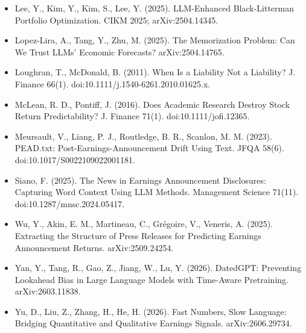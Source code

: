 \documentclass[xelatex,ja=standard,jafont=haranoaji,a4paper,10pt]{bxjsarticle}
\begin{document}
\begin{small}
\begin{itemize}[leftmargin=1.2em,itemsep=0.1em]
\item Lee, Y., Kim, Y., Kim, S., Lee, Y. (2025). LLM-Enhanced Black-Litterman Portfolio Optimization. CIKM 2025; arXiv:2504.14345.
\item Lopez-Lira, A., Tang, Y., Zhu, M. (2025). The Memorization Problem: Can We Trust LLMs' Economic Forecasts? arXiv:2504.14765.
\item Loughran, T., McDonald, B. (2011). When Is a Liability Not a Liability? J. Finance 66(1). doi:10.1111/j.1540-6261.2010.01625.x.
\item McLean, R. D., Pontiff, J. (2016). Does Academic Research Destroy Stock Return Predictability? J. Finance 71(1). doi:10.1111/jofi.12365.
\item Meursault, V., Liang, P. J., Routledge, B. R., Scanlon, M. M. (2023). PEAD.txt: Post-Earnings-Announcement Drift Using Text. JFQA 58(6). doi:10.1017/S0022109022001181.
\item Siano, F. (2025). The News in Earnings Announcement Disclosures: Capturing Word Context Using LLM Methods. Management Science 71(11). doi:10.1287/mnsc.2024.05417.
\item Wu, Y., Akin, E. M., Martineau, C., Grégoire, V., Veneris, A. (2025). Extracting the Structure of Press Releases for Predicting Earnings Announcement Returns. arXiv:2509.24254.
\item Yan, Y., Tang, R., Gao, Z., Jiang, W., Lu, Y. (2026). DatedGPT: Preventing Lookahead Bias in Large Language Models with Time-Aware Pretraining. arXiv:2603.11838.
\item Yu, D., Liu, Z., Zhang, H., He, H. (2026). Fast Numbers, Slow Language: Bridging Quantitative and Qualitative Earnings Signals. arXiv:2606.29734.
\end{itemize}
\end{small}
\end{document}

